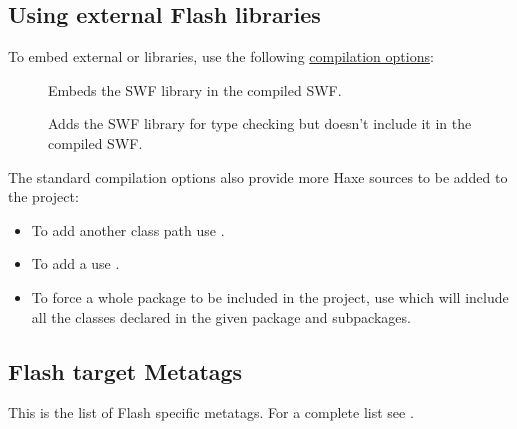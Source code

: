 \subsection{Using external Flash libraries}
\label{target-flash-external-libraries}

To embed external  or  libraries, use the following \href{http://haxe.org/documentation/introduction/compiler-usage.html}{compilation options}:

\begin{description}
	\item[] Embeds the SWF library in the compiled SWF.
	\item[] Adds the SWF library for type checking but doesn't include it in the compiled SWF.
\end{description}

The standard compilation options also provide more Haxe sources to be added to the project:

\begin{itemize}
	\item To add another class path use .
	\item To add a  use .
	\item To force a whole package to be included in the project, use  which will include all the classes declared in the given package and subpackages. 
\end{itemize}

\subsection{Flash target Metatags}
\label{target-flash-metatags}

This is the list of Flash specific metatags. For a complete list see .

